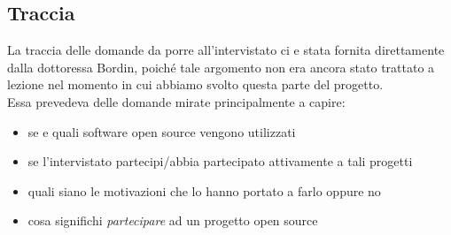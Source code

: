 \documentclass[12pt]{article} %
\begin{document}
\subsection{Traccia}
La traccia delle domande da porre all'intervistato ci e stata fornita direttamente dalla dottoressa Bordin, poiché tale argomento non era ancora stato trattato a lezione nel momento in cui abbiamo svolto questa parte del progetto.\\
Essa prevedeva delle domande mirate principalmente a capire:
\begin{itemize}
\item se e quali software open source vengono utilizzati
\item se l'intervistato partecipi/abbia partecipato attivamente a tali progetti
\item quali siano le motivazioni che lo hanno portato a farlo oppure no
\item cosa significhi \emph{partecipare} ad un progetto open source
\end{itemize}
\end{document}
